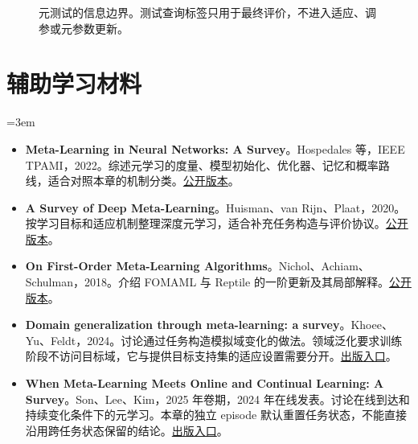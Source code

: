 \begin{figure}[htbp]
\centering
{}
\caption{元测试的信息边界。测试查询标签只用于最终评价，不进入适应、调参或元参数更新。}
\label{fig:meta-evaluation}
\end{figure}

\section*{辅助学习材料}
\begingroup
\emergencystretch=3em
\begin{itemize}
\item \textbf{Meta-Learning in Neural Networks: A Survey}。Hospedales 等，IEEE TPAMI，2022。综述元学习的度量、模型初始化、优化器、记忆和概率路线，适合对照本章的机制分类。\href{https://arxiv.org/abs/2004.05439}{公开版本}。
\item \textbf{A Survey of Deep Meta-Learning}。Huisman、van Rijn、Plaat，2020。按学习目标和适应机制整理深度元学习，适合补充任务构造与评价协议。\href{https://arxiv.org/abs/2010.03522}{公开版本}。
\item \textbf{On First-Order Meta-Learning Algorithms}。Nichol、Achiam、Schulman，2018。介绍 FOMAML 与 Reptile 的一阶更新及其局部解释。\href{https://arxiv.org/abs/1803.02999}{公开版本}。
\item \textbf{Domain generalization through meta-learning: a survey}。Khoee、Yu、Feldt，2024。讨论通过任务构造模拟域变化的做法。领域泛化要求训练阶段不访问目标域，它与提供目标支持集的适应设置需要分开。\href{https://doi.org/10.1007/s10462-024-10922-z}{出版入口}。
\item \textbf{When Meta-Learning Meets Online and Continual Learning: A Survey}。Son、Lee、Kim，2025 年卷期，2024 年在线发表。讨论在线到达和持续变化条件下的元学习。本章的独立 episode 默认重置任务状态，不能直接沿用跨任务状态保留的结论。\href{https://doi.org/10.1109/TPAMI.2024.3463709}{出版入口}。
\end{itemize}
\endgroup

